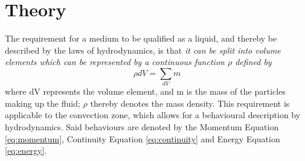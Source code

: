 \documentclass[10pt, nofootinbib, twocolumn]{revtex4-1}
\begin{document}
\section{Theory}\label{sec:theory}
The requirement for a medium to be qualified as a liquid, and thereby be described by the laws of hydrodynamics, is that \textit{it can be split into volume elements which can be represented by a continuous function $\rho$ defined by} \cite{ast}
\begin{equation}
    \rho dV = \sum_{dV}{m}
\end{equation}
where dV represents the volume element, and m is the mass of the particles making up the fluid; $\rho$ thereby denotes the mass density. This requirement is applicable to the convection zone, which allows for a behavioural description by hydrodynamics. Said behaviours are denoted by the Momentum Equation \eqref{eq:momentum}, Continuity Equation \eqref{eq:continuity} and Energy Equation \eqref{eq:energy}.
\end{document}
